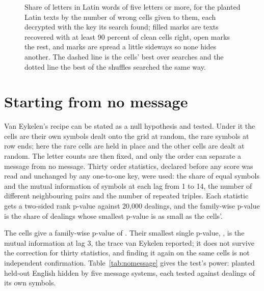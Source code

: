 \documentclass[11pt]{article}
\theoremstyle{definition}
\begin{document}
\begin{figure}[t]
\centering

\caption{Share of letters in Latin words of five letters or more, for the \lwdPlanted{} planted Latin texts by the number of wrong cells given to them, each decrypted with the key its search found; filled marks are texts recovered with at least 90 percent of clean cells right, open marks the rest, and marks are spread a little sideways so none hides another. The dashed line is the cells' best over \lwdSearches{} searches and the dotted line the best of the \lwdShuffles{} shuffles searched the same way.}
\label{fig:words}
\end{figure}

\section{Starting from no message}\label{sec:nomessage}

Van Eykelen's recipe \cite{vaneykelen2026xv} can be stated as a null hypothesis and tested. Under it the cells are their own symbols dealt onto the grid at random, the rare symbols at row ends; here the \nmFixed{} rare cells are held in place and the other cells are dealt at random. The letter counts are then fixed, and only the order can separate a message from no message. Thirty order statistics, declared before any score was read and unchanged by any one-to-one key, were used: the share of equal symbols and the mutual information of symbols at each lag from 1 to 14, the number of different neighbouring pairs and the number of repeated triples. Each statistic gets a two-sided rank p-value against 20,000 dealings, and the family-wise p-value is the share of dealings whose smallest p-value is as small as the cells'.

The cells give a family-wise p-value of \nmFamilyP{}. Their smallest single p-value, \nmSmallestP{}, is the mutual information at lag 3, the trace van Eykelen reported; it does not survive the correction for thirty statistics, and finding it again on the same cells is not independent confirmation. Table~\ref{tab:nomessage} gives the test's power: planted held-out English hidden by five message systems, each tested against dealings of its own symbols.
\end{document}
